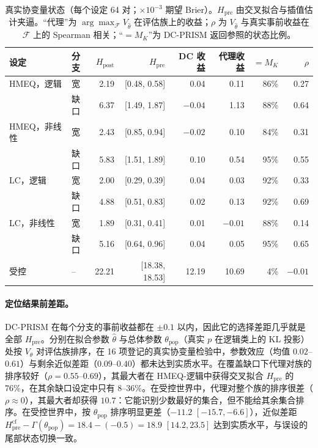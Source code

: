 \documentclass[runningheads]{llncs}
\begin{document}
\begin{table}[t]
\caption{真实协变量状态（每个设定 64 对；$\times10^{-3}$ 期望 Brier）。$H_{\mathrm{pre}}$ 由交叉拟合与插值估计夹逼。“代理”为 $\arg\max_{\mathcal F}V_{\widehat\theta}$ 在评估族上的收益；$\rho$ 为 $V_{\widehat\theta}$ 与真实事前收益在 $\mathcal F$ 上的 Spearman 相关；“$=M_K$”为 DC-PRISM 返回参照的状态比例。}
\label{tab:realx}
\centering\small
\setlength{\tabcolsep}{2.5pt}
\begin{tabular}{llrrrrrr}
\toprule
设定 & 分支 & $H_{\mathrm{post}}$ & $H_{\mathrm{pre}}$ & DC 收益 & 代理收益 & $=M_K$ & $\rho$ \\
\midrule
HMEQ，逻辑 & 宽 & 2.19 & [0.48, 0.58] & 0.04 & 0.11 & 86\% & 0.27 \\
 & 缺口 & 6.37 & [1.49, 1.87] & $-0.04$ & 1.13 & 88\% & 0.64 \\
HMEQ，非线性 & 宽 & 2.43 & [0.85, 0.94] & $-0.02$ & 0.10 & 84\% & 0.31 \\
 & 缺口 & 5.83 & [1.51, 1.89] & 0.10 & 0.54 & 95\% & 0.55 \\
LC，逻辑 & 宽 & 2.00 & [0.29, 0.39] & 0.04 & 0.03 & 92\% & 0.33 \\
 & 缺口 & 4.88 & [0.51, 0.83] & 0.02 & 0.13 & 92\% & 0.69 \\
LC，非线性 & 宽 & 1.89 & [0.31, 0.41] & 0.01 & $-0.01$ & 88\% & 0.14 \\
 & 缺口 & 5.16 & [0.64, 0.96] & 0.04 & 0.05 & 95\% & 0.65 \\
\midrule
受控 & -- & 22.21 & [18.38, 18.53] & 12.19 & 10.69 & 4\% & $-0.01$ \\
\bottomrule
\end{tabular}
\end{table}

\paragraph{定位结果前差距。}DC-PRISM 在每个分支的事前收益都在 $\pm0.1$ 以内，因此它的选择差距几乎就是全部 $H_{\mathrm{pre}}$。分别在拟合参数 $\widehat\theta$ 与总体参数 $\theta_{\mathrm{pop}}$（真实 $p$ 在逻辑类上的 KL 投影）处按 $V_\theta$ 对评估族排序，在 16 项登记的真实协变量检验中，参数效应（均值 $0.02$--$0.61$）与剩余近似差距（$0.09$--$0.40$）都未达到实质水平。在覆盖缺口下代理对族的排序较好（$\rho=0.55$--$0.69$），其最大者在 HMEQ-逻辑中获得交叉拟合 $H_{\mathrm{pre}}$ 的 76\%，在其余缺口设定中只有 8--36\%。在受控世界中，代理对整个族的排序很差（$\rho\approx0$），其最大者却获得 $10.7$：它能识别少数最好的集合，但不能给其余集合排序。在受控世界中，按 $\theta_{\mathrm{pop}}$ 排序明显更差（$-11.2$ $[-15.7,-6.6]$），近似差距 $H_{\mathrm{pre}}^{\text{cf}}-\Gamma(\theta_{\mathrm{pop}})=18.4-(-0.5)=18.9$ $[14.2,23.5]$ 达到实质水平，与误设的尾部状态切换一致。
\end{document}
